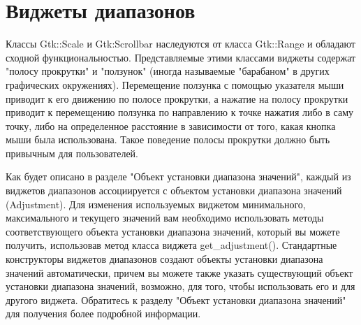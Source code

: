 \chapter{Виджеты диапазонов}
 Классы Gtk::Scale и Gtk:Scrollbar наследуются от класса Gtk::Range и обладают сходной функциональностью. Представляемые этими классами виджеты содержат "полосу прокрутки" и "ползунок" (иногда называемые "барабаном" в других графических окружениях). Перемещение ползунка с помощью указателя мыши приводит к его движению по полосе прокрутки, а нажатие на полосу прокрутки приводит к перемещению ползунка по направлению к точке нажатия либо в саму точку, либо на определенное расстояние в зависимости от того, какая кнопка мыши была использована. Такое поведение полосы прокрутки должно быть привычным для пользователей.

Как будет описано в разделе "Объект установки диапазона значений", каждый из виджетов диапазонов ассоциируется с объектом установки диапазона значений (Adjustment). Для изменения используемых виджетом минимального, максимального и текущего значений вам необходимо использовать методы соответствующего объекта установки диапазона значений, который вы можете получить, использовав метод класса виджета get\_adjustment(). Стандартные конструкторы виджетов диапазонов создают объекты установки диапазона значений автоматически, причем вы можете также указать существующий объект установки диапазона значений, возможно, для того, чтобы использовать его и для другого виджета. Обратитесь к разделу "Объект установки диапазона значений" для получения более подробной информации. 

